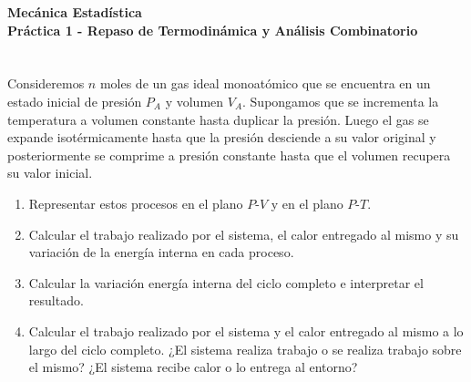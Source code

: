 \documentclass[a4paper,11pt]{article}
\begin{document}
\pagestyle{fancy}
\chead{\small \the\year}



\thispagestyle{plain}
\begin{center}
    \textbf{\large
        Mecánica Estadística \\
        Práctica 1 - Repaso de Termodinámica y Análisis Combinatorio
    }
\end{center}
\vspace{-1.5em}



\section{}

Consideremos $n$ moles de un gas ideal monoatómico que se encuentra en
un estado inicial de presión $P_A$ y volumen $V_A$. Supongamos que se
incrementa la temperatura a volumen constante hasta duplicar la
presión. Luego el gas se expande isotérmicamente hasta que la presión
desciende a su valor original y posteriormente se comprime a presión
constante hasta que el volumen recupera su valor inicial.

\begin{enumerate}[label=(\alph*),
                  leftmargin=2\parindent,
                  rightmargin=2\parindent]

    \item{Representar estos procesos en el plano $P$-$V$ y en el plano
          $P$-$T$.}

    \item{Calcular el trabajo realizado por el sistema, el calor
          entregado al mismo y su variación de la energía interna en
          cada proceso.}

    \item{Calcular la variación energía interna del ciclo completo e
          interpretar el resultado.}

    \item{Calcular el trabajo realizado por el sistema y el calor
          entregado al mismo a lo largo del ciclo completo. ¿El sistema
          realiza trabajo o se realiza trabajo sobre el mismo? ¿El
          sistema recibe calor o lo entrega al entorno?}

\end{enumerate}
\end{document}
